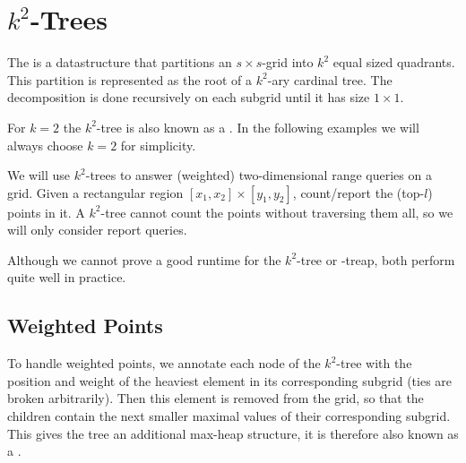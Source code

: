 \section{$k^2$-Trees}

\begin{Definition}
  The  is a datastructure that partitions an $s \times s$-grid into $k^2$ equal sized quadrants. This partition is represented as the root of a $k^2$-ary cardinal tree. The decomposition is done recursively on each subgrid until it has size $1 \times 1$.
\end{Definition}

For $k = 2$ the $k^2$-tree is also known as a . In the following examples we will always choose $k = 2$ for simplicity.

We will use $k^2$-trees to answer (weighted) two-dimensional range queries on a grid. Given a rectangular region $[x_1, x_2] \times [y_1, y_2]$, count/report the (top-$l$) points in it. A $k^2$-tree cannot count the points without traversing them all, so we will only consider report queries.

Although we cannot prove a good runtime for the $k^2$-tree or -treap, both perform quite well in practice.


\subsection{Weighted Points}
To handle weighted points, we annotate each node of the $k^2$-tree with the position and weight of the heaviest element in its corresponding subgrid (ties are broken arbitrarily). Then this element is removed from the grid, so that the children contain the next smaller maximal values of their corresponding subgrid. This gives the tree an additional max-heap structure, it is therefore also known as a .

